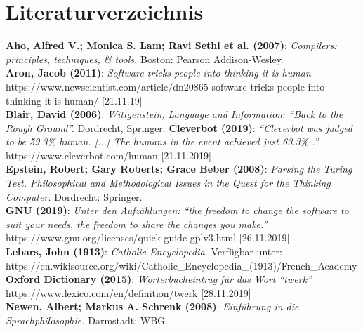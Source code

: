 \documentclass[a4paper,10pt]{article}
\begin{document}
\section*{Literaturverzeichnis}
\label{Literaturverzeichnis}
\textbf{Aho, Alfred V.; Monica S. Lam; Ravi Sethi et al. (2007)}: \textit{Compilers: \\ principles, techniques, \& tools.} Boston: Pearson Addison-Wesley. \\
\textbf{Aron, Jacob (2011)}: \textit{Software tricks people into thinking it is human} \\ https://www.newscientist.com/article/dn20865-software-tricks-people-into-thinking-it-is-human/ [21.11.19] \\
\textbf{Blair, David (2006)}: \textit{Wittgenstein, Language and Information: \enquote{Back to the Rough Ground}.} Dordrecht, Springer.
\textbf{Cleverbot (2019)}: \textit{\enquote{Cleverbot was judged to be 59.3\% human. [...] The humans in the event achieved just 63.3\% .}} https://www.cleverbot.com/human [21.11.2019] \\
\textbf{Epstein, Robert; Gary Roberts; Grace Beber (2008)}: \textit{Parsing the Turing Test. Philosophical and Methodological Issues in the Quest for the Thinking Computer.} Dordrecht: Springer. \\
\textbf{GNU (2019)}: \textit{Unter den Aufzählungen: \enquote{the freedom to change the software to suit your needs, the freedom to share the changes you make.}} \\
https://www.gnu.org/licenses/quick-guide-gplv3.html [26.11.2019] \\
\textbf{Lebars, John (1913)}: \textit{Catholic Encyclopedia.} Verfügbar unter: \\ https://en.wikisource.org/wiki/Catholic\_Encyclopedia\_(1913)/French\_Academy \\
\textbf{Oxford Dictionary (2015)}: \textit{Wörterbucheintrag für das Wort \enquote{twerk}} \\ https://www.lexico.com/en/definition/twerk [28.11.2019] \\
\textbf{Newen, Albert; Markus A. Schrenk (2008)}: \textit{Einführung in die Sprachphilosophie.} Darmstadt: WBG. \\
\end{document}
